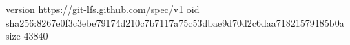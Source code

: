 version https://git-lfs.github.com/spec/v1
oid sha256:8267e0f3c3ebe79174d210c7b7117a75c53dbae9d70d2c6daa71821579185b0a
size 43840
